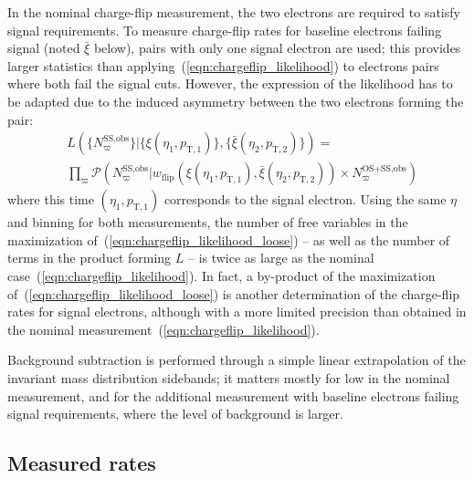 In the nominal charge-flip measurement, the two electrons are required to satisfy signal requirements. 
To measure charge-flip rates for baseline electrons failing signal (noted $\bar\xi$ below), 
pairs with only one signal electron are used; 
this provides larger statistics than applying~(\ref{eqn:chargeflip_likelihood}) to electrons pairs where both fail the signal cuts. 
However, the expression of the likelihood has to be adapted due to the induced asymmetry between the two electrons forming the pair: 
\begin{equation}
\begin{aligned}
{} & L(\{N^\text{SS,obs}_\varpi\}|\{\xi(\eta_1,p_{\mathrm{T},1})\},\{\bar\xi(\eta_2,p_{\mathrm{T},2})\}) 
= \\
& \prod_{\varpi} \mathcal P\left(N^\text{SS,obs}_\varpi|w_\text{flip}(\xi(\eta_1,p_{\mathrm{T},1}),\bar\xi(\eta_2,p_{\mathrm{T},2}))\times N^\text{OS+SS,obs}_\varpi\right)
\label{eqn:chargeflip_likelihood_loose}
\end{aligned}%
\end{equation}
where this time $(\eta_1,p_{\mathrm{T},1})$ corresponds to the signal electron. 
Using the same $\eta$ and \pt binning for both measurements, 
the number of free variables in the maximization of~(\ref{eqn:chargeflip_likelihood_loose}) 
-- as well as the number of terms in the product forming $L$ -- 
is twice as large as the nominal case~(\ref{eqn:chargeflip_likelihood}). 
In fact, a by-product of the maximization of~(\ref{eqn:chargeflip_likelihood_loose}) is another determination of the charge-flip rates for signal electrons, 
although with a more limited precision than obtained in the nominal measurement~(\ref{eqn:chargeflip_likelihood}).

Background subtraction is performed through a simple linear extrapolation of the invariant mass distribution sidebands; 
it matters mostly for low \pt in the nominal measurement, 
and for the additional measurement with baseline electrons failing signal requirements, where the level of background is larger. 

\subsection*{Measured rates}
\label{subsec:chargeflip_rates}

